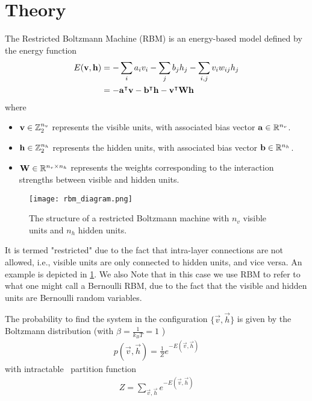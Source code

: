 \section{Theory}
The Restricted Boltzmann Machine (RBM) is an energy-based model defined by the energy function
\begin{align}
    E(\mathbf{v}, \mathbf{h})
        &= -\sum_i a_i v_i - \sum_j b_j h_j - \sum_{i,j} v_i w_{ij} h_j \label{eq:rbm_energy} \\
        &= -\mathbf{a}^\intercal\mathbf{v} - \mathbf{b}^\intercal\mathbf{h} - \mathbf{v}^\intercal\mathbf{W}\mathbf{h} \label{eq:rbm_energy_vectorized}
\end{align}
where
\begin{itemize}
    \item \( \mathbf{v} \in \mathbb{Z}_2^{n_v} \) represents the visible units, with associated bias vector \( \mathbf{a} \in \mathbb{R}^{n_v} \).
    \item \( \mathbf{h} \in \mathbb{Z}_2^{n_h} \) represents the hidden units, with associated bias vector \( \mathbf{b} \in \mathbb{R}^{n_h} \).
    \item \( \mathbf{W} \in \mathbb{R}^{n_v \times n_h} \) represents the weights corresponding to the interaction strengths between visible and hidden units.
\end{itemize}

\begin{figure}[ht]
    \begin{center}
        \texttt{[image: rbm\_diagram.png]}
    \end{center}
    \caption{The structure of a restricted Boltzmann machine with \( n_v \) visible units and \( n_h \) hidden units.}
    \label{fig:rbm_diagram}
\end{figure}

It is termed "restricted" due to the fact that intra-layer connections are not allowed, i.e., visible units are only connected to hidden units, and vice versa.
An example is depicted in \cref{fig:rbm_diagram}.
We also Note that in this case we use RBM to refer to what one might call a Bernoulli RBM, due to the fact that the visible and hidden units are Bernoulli random variables.

The probability to find the system in the configuration \( \{\vec{v},\vec{h}\} \) is given by the Boltzmann distribution (with \( \beta = \frac{1}{k_BT} = 1 \) )
\begin{align}
    p(\vec{v}, \vec{h}) = \frac{1}{Z} e^{-E(\vec{v},\vec{h})}
\end{align}
with intractable~\cite{long_servedio_2010} partition function
\begin{align}
    Z = \sum_{\vec{v},\vec{h}} e^{-E(\vec{v},\vec{h})}
\end{align}

